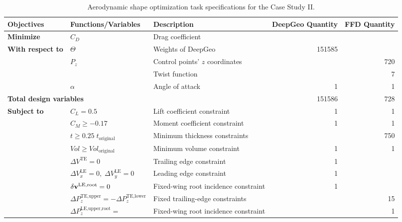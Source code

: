 \begin{table}[!t]
  \centering
  \caption{\small Aerodynamic shape optimization task specifications for the Case Study II.}
  \resizebox{1\columnwidth}{!} {
        \begin{tabular}{lllrr}
        \hline
        \multicolumn{1}{l}{\textbf{Objectives}} & \textbf{Functions/Variables} & \textbf{Description} & \multicolumn{1}{l}{\textbf{DeepGeo Quantity}} & \multicolumn{1}{l}{\textbf{FFD Quantity}} \\
        \hline
        \multicolumn{1}{l}{\textbf{Minimize}} & $C_D$  & Drag coefficient &        &  \\
        \hline
        \multicolumn{1}{l}{\multirow{3}[2]{*}{\textbf{With respect to}}} & $\Theta$ & Weights of DeepGeo & \num{151585} &         \\
        \multicolumn{1}{l}{} & $P_z$  & Control points' $z$ coordinates &        & 720 \\
        \multicolumn{1}{l}{} &   & Twist function &        & 7 \\
        \multicolumn{1}{l}{} & $\alpha$ & Angle of attack & 1      & 1 \\
        \hline
        \multicolumn{3}{l}{\textbf{Total design variables}} & \num{151586} & 728 \\
        \hline
        \multicolumn{1}{l}{\multirow{9}[2]{*}{\textbf{Subject to}}} & $C_L=0.5$ & Lift coefficient constraint & 1      & 1 \\
        \multicolumn{1}{r}{} & $C_M\geq-0.17$ & Moment coefficient constraint & 1      & 1 \\
        \multicolumn{1}{r}{} & $t \ge 0.25 \; t_\text{original}$ & Minimum thickness constraints &        & 750 \\
        \multicolumn{1}{r}{} & $Vol \ge {Vol}_\text{original}$ & Minimum volume constraint & 1      & 1  \\
        \multicolumn{1}{r}{} & $\Delta V^\text{TE}=0$ & Trailing edge constraint & 1      &  \\
        \multicolumn{1}{r}{} & $\Delta V^\text{LE}_x=0,\;\Delta V^\text{LE}_y=0$ & Leading edge constraint & 1      &  \\
        \multicolumn{1}{r}{} & $\delta\mathbf{v}^{\text{LE,root}}=0$ & Fixed-wing root incidence constraint & 1      &  \\
        \multicolumn{1}{r}{} & $\Delta P^{\text{TE,upper}}_z = -\Delta P^{\text{TE,lower}}_z$ & Fixed trailing-edge constraints &        & 15 \\
        \multicolumn{1}{l}{} & $\Delta P^{\text{LE,upper,root}}_z =$ & \multirow{2}[1]{*}{Fixed-wing root incidence constraint} & \multirow{2}[1]{*}{} & \multirow{2}[1]{*}{1} \\

\end{tabular}}
\end{table}
